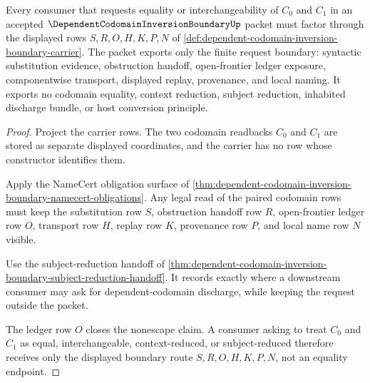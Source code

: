 \begin{theorem}
\label{thm:dependent-codomain-inversion-boundary-codomain-readback-nonescape}
Every consumer that requests equality or interchangeability of $C_0$ and $C_1$ in an accepted $\DependentCodomainInversionBoundaryUp$ packet must factor through the displayed rows $S,R,O,H,K,P,N$ of \autoref{def:dependent-codomain-inversion-boundary-carrier}. The packet exports only the finite request boundary: syntactic substitution evidence, obstruction handoff, open-frontier ledger exposure, componentwise transport, displayed replay, provenance, and local naming. It exports no codomain equality, context reduction, subject reduction, inhabited discharge bundle, or host conversion principle.
\end{theorem}
\begin{proof}
Project the carrier rows. The two codomain readbacks $C_0$ and $C_1$ are stored as separate displayed coordinates, and the carrier has no row whose constructor identifies them.

Apply the NameCert obligation surface of \autoref{thm:dependent-codomain-inversion-boundary-namecert-obligations}. Any legal read of the paired codomain rows must keep the substitution row $S$, obstruction handoff row $R$, open-frontier ledger row $O$, transport row $H$, replay row $K$, provenance row $P$, and local name row $N$ visible.

Use the subject-reduction handoff of \autoref{thm:dependent-codomain-inversion-boundary-subject-reduction-handoff}. It records exactly where a downstream consumer may ask for dependent-codomain discharge, while keeping the request outside the packet.

The ledger row $O$ closes the nonescape claim. A consumer asking to treat $C_0$ and $C_1$ as equal, interchangeable, context-reduced, or subject-reduced therefore receives only the displayed boundary route $S,R,O,H,K,P,N$, not an equality endpoint.
\end{proof}

